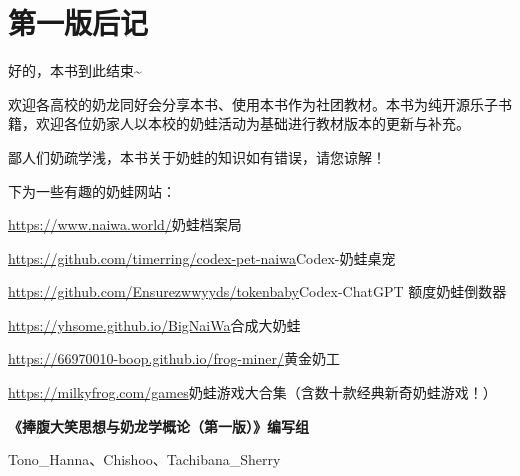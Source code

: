 
\clearpage
\section{第一版后记}

好的，本书到此结束\textasciitilde{}

欢迎各高校的奶龙同好会分享本书、使用本书作为社团教材。本书为纯开源乐子书籍，欢迎各位奶家人以本校的奶蛙活动为基础进行教材版本的更新与补充。

鄙人们奶疏学浅，本书关于奶蛙的知识如有错误，请您谅解！



下为一些有趣的奶蛙网站：

\begingroup
\small
\noindent \url{https://www.naiwa.world/}\quad 奶蛙档案局\par
\noindent \url{https://github.com/timerring/codex-pet-naiwa}\quad Codex-奶蛙桌宠\par
\noindent \url{https://github.com/Ensurezwwyyds/tokenbaby}\quad Codex-ChatGPT 额度奶蛙倒数器\par
\noindent \url{https://yhsome.github.io/BigNaiWa}\quad 合成大奶蛙\par
\noindent \url{https://66970010-boop.github.io/frog-miner/}\quad 黄金奶工\par
\noindent \url{https://milkyfrog.com/games}\quad 奶蛙游戏大合集（含数十款经典新奇奶蛙游戏！）\par
\endgroup

\begin{flushright}
\bfseries
《捧腹大笑思想与奶龙学概论（第一版）》编写组\par
Tono\_Hanna、Chishoo、Tachibana\_Sherry
\end{flushright}

